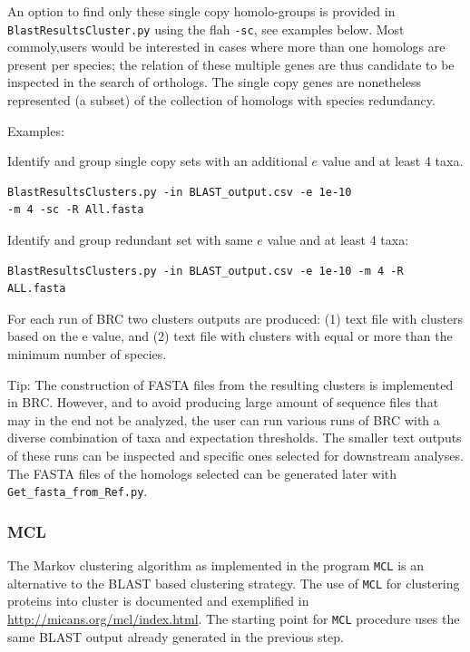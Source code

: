 \documentclass[10pt]{article}
\begin{document}
An option to find only these single copy homolo-groups is provided in
\texttt{BlastResultsCluster.py} using the flah \texttt{-sc}, see examples below. 
Most commoly,users would be interested in cases where more than one  homologs are present per species; the relation of these multiple genes 
are thus candidate to be inspected in the search of orthologs. The single
copy genes are nonetheless represented (a subset) of the collection
of homologs with species redundancy.


Examples:

Identify and group single copy sets with an additional $e$ value and at
least 4 taxa.

\begin{verbatim}
BlastResultsClusters.py -in BLAST_output.csv -e 1e-10
-m 4 -sc -R All.fasta
\end{verbatim}

Identify and group redundant set with same $e$ value and at least 4
taxa:

\begin{verbatim} 
BlastResultsClusters.py -in BLAST_output.csv -e 1e-10 -m 4 -R ALL.fasta
\end{verbatim}

For each run of BRC two clusters outputs are produced: (1) text file
with clusters based on the e value, and (2) text file with clusters
with equal or more than the minimum number of species.


Tip: The construction of FASTA files from the resulting clusters is
implemented in BRC. However, and to avoid producing large amount of
sequence files that may in the end not be analyzed, the user can run
various runs of BRC with a diverse combination of taxa and expectation
thresholds. The smaller text outputs of these runs can be inspected
and specific ones selected for downstream analyses. The FASTA files of
the homologs selected can be generated later with
\texttt{Get\_fasta\_from\_Ref.py}.

\subsubsection{MCL} The Markov clustering algorithm as implemented in
the program \texttt{MCL} is an alternative to the BLAST based clustering
strategy. The use of \texttt{MCL} for clustering proteins into cluster is
documented and exemplified in
\url{http://micans.org/mcl/index.html}. The starting point for \texttt{MCL}
procedure uses the same BLAST output already generated in the
previous step.
\end{document}
